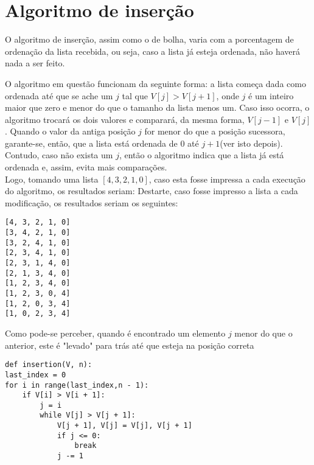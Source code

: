 \section{Algoritmo de inserção}
O algoritmo de inserção, assim como o de bolha, varia com a porcentagem de ordenação da lista recebida, ou seja, caso a lista já esteja ordenada, não haverá nada a ser feito. 


O algoritmo em questão funcionam da seguinte forma: a lista começa dada como ordenada até que se ache um $j$ tal que $V[j]>V[j+1]$, onde $j$ é um inteiro maior que zero e menor do que o tamanho da lista menos um. 
Caso isso ocorra, o algoritmo trocará os dois valores e comparará, da mesma forma, $V[j-1]$ e $V[j]$. Quando o valor da antiga posição $j$ for menor do que a posição sucessora, garante-se, então, que a lista está ordenada de 0 até $j+1$(ver isto depois). Contudo, caso não exista um $j$, então o algoritmo indica que a lista já está ordenada e, assim, evita mais comparações.
\\

Logo, tomando uma lista $[4,3,2,1,0]$, caso esta fosse impressa a cada execução do algoritmo, os resultados seriam:
Destarte, caso fosse impresso a lista a cada modificação, os resultados seriam os seguintes:
\begin{lstlisting}
[4, 3, 2, 1, 0]
[3, 4, 2, 1, 0]
[3, 2, 4, 1, 0]
[2, 3, 4, 1, 0]
[2, 3, 1, 4, 0]
[2, 1, 3, 4, 0]
[1, 2, 3, 4, 0]
[1, 2, 3, 0, 4]
[1, 2, 0, 3, 4]
[1, 0, 2, 3, 4]
\end{lstlisting}

Como pode-se perceber, quando é encontrado um elemento $j$ menor do que o anterior, este é "levado" para trás até que esteja na posição correta

\begin{lstlisting}
def insertion(V, n):
last_index = 0
for i in range(last_index,n - 1):
    if V[i] > V[i + 1]:
        j = i
        while V[j] > V[j + 1]:
            V[j + 1], V[j] = V[j], V[j + 1]
            if j <= 0:
                break
            j -= 1
\end{lstlisting}